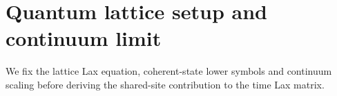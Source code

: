 \section{Quantum lattice setup and continuum limit}
\label{sec:setup}

We fix the lattice Lax equation, coherent-state lower symbols and continuum
scaling before deriving the shared-site contribution to the time Lax matrix.





